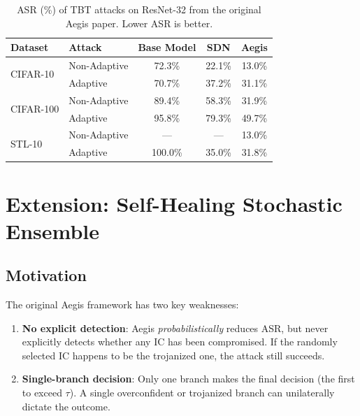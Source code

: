 \documentclass[12pt,a4paper]{article}
\newcommand{\asr}{\textsc{ASR}}
\newcommand{\tbt}{\textsc{TBT}}
\newcommand{\ic}{\textsc{IC}}
\begin{document}
\begin{table}[H]
    \centering
    \caption{\asr{} (\%) of \tbt{} attacks on ResNet-32 from the original Aegis paper. Lower \asr{} is better.}
    \label{tab:original_aegis}
    \begin{tabular}{llccc}
        \toprule
        \textbf{Dataset} & \textbf{Attack} & \textbf{Base Model} & \textbf{SDN} & \textbf{Aegis} \\
        \midrule
        \multirow{2}{*}{CIFAR-10}   & Non-Adaptive & 72.3\% & 22.1\% & 13.0\% \\
                                     & Adaptive     & 70.7\% & 37.2\% & 31.1\% \\
        \midrule
        \multirow{2}{*}{CIFAR-100}  & Non-Adaptive & 89.4\% & 58.3\% & 31.9\% \\
                                     & Adaptive     & 95.8\% & 79.3\% & 49.7\% \\
        \midrule
        \multirow{2}{*}{STL-10}     & Non-Adaptive & ---    & ---    & 13.0\% \\
                                     & Adaptive     & 100.0\% & 35.0\% & 31.8\% \\
        \bottomrule
    \end{tabular}
\end{table}

\section{Extension: Self-Healing Stochastic Ensemble}
\label{sec:extension}

\subsection{Motivation}

The original Aegis framework has two key weaknesses:
\begin{enumerate}
    \item \textbf{No explicit detection}: Aegis \emph{probabilistically} reduces \asr{}, but never explicitly detects whether any \ic{} has been compromised. If the randomly selected \ic{} happens to be the trojanized one, the attack still succeeds.
    \item \textbf{Single-branch decision}: Only one branch makes the final decision (the first to exceed $\tau$). A single overconfident or trojanized branch can unilaterally dictate the outcome.
\end{enumerate}
\end{document}
